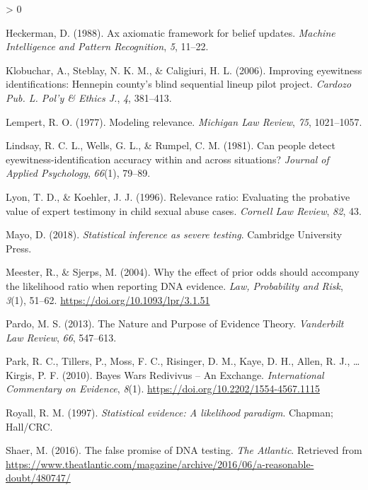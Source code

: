 \documentclass[
  10pt,
  dvipsnames,enabledeprecatedfontcommands]{scrartcl}
\newlength{\cslhangindent}
\newenvironment{CSLReferences}[2] %
 {%
  \setlength{\parindent}{0pt}
  \ifodd #1 \everypar{\setlength{\hangindent}{\cslhangindent}}\ignorespaces\fi
  \ifnum #2 > 0
  \setlength{\parskip}{#2\baselineskip}
  \fi
 }%
 {}
\begin{document}
\begin{CSLReferences}{1}{0}
\leavevmode\hypertarget{ref-Heckerman1988axiomatic}{}%
Heckerman, D. (1988). Ax axiomatic framework for belief updates.
\emph{Machine Intelligence and Pattern Recognition}, \emph{5}, 11--22.

\leavevmode\hypertarget{ref-klobuchar2006improving}{}%
Klobuchar, A., Steblay, N. K. M., \& Caligiuri, H. L. (2006). Improving
eyewitness identifications: Hennepin county's blind sequential lineup
pilot project. \emph{Cardozo Pub. L. Pol'y \& Ethics J.}, \emph{4},
381--413.

\leavevmode\hypertarget{ref-lempert1977modeling}{}%
Lempert, R. O. (1977). Modeling relevance. \emph{Michigan Law Review},
\emph{75}, 1021--1057.

\leavevmode\hypertarget{ref-Lindsay1981CanPeopleDetect}{}%
Lindsay, R. C. L., Wells, G. L., \& Rumpel, C. M. (1981). Can people
detect eyewitness-identification accuracy within and across situations?
\emph{Journal of Applied Psychology}, \emph{66}(1), 79--89.

\leavevmode\hypertarget{ref-lyon1996relevance}{}%
Lyon, T. D., \& Koehler, J. J. (1996). Relevance ratio: Evaluating the
probative value of expert testimony in child sexual abuse cases.
\emph{Cornell Law Review}, \emph{82}, 43.

\leavevmode\hypertarget{ref-mayo2018}{}%
Mayo, D. (2018). \emph{Statistical inference as severe testing}.
Cambridge University Press.

\leavevmode\hypertarget{ref-meester2004WhyEffectPriora}{}%
Meester, R., \& Sjerps, M. (2004). Why the effect of prior odds should
accompany the likelihood ratio when reporting {DNA} evidence. \emph{Law,
Probability and Risk}, \emph{3}(1), 51--62.
\url{https://doi.org/10.1093/lpr/3.1.51}

\leavevmode\hypertarget{ref-pardo2013NaturePurposeEvidence}{}%
Pardo, M. S. (2013). The {Nature} and {Purpose} of {Evidence Theory}.
\emph{Vanderbilt Law Review}, \emph{66}, 547--613.

\leavevmode\hypertarget{ref-park2010BayesWarsRedivivus}{}%
Park, R. C., Tillers, P., Moss, F. C., Risinger, D. M., Kaye, D. H.,
Allen, R. J., \ldots{} Kirgis, P. F. (2010). Bayes {Wars Redivivus} --
{An Exchange}. \emph{International Commentary on Evidence}, \emph{8}(1).
\url{https://doi.org/10.2202/1554-4567.1115}

\leavevmode\hypertarget{ref-Royall1997}{}%
Royall, R. M. (1997). \emph{Statistical evidence: A likelihood
paradigm}. Chapman; Hall/CRC.

\leavevmode\hypertarget{ref-Shaer2016False}{}%
Shaer, M. (2016). The false promise of DNA testing. \emph{The Atlantic}.
Retrieved from
\url{https://www.theatlantic.com/magazine/archive/2016/06/a-reasonable-doubt/480747/}


\end{CSLReferences}
\end{document}
